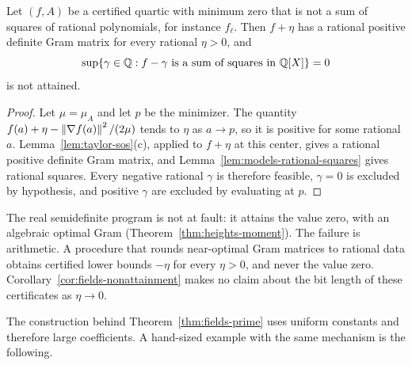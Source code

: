 \begin{corollary}
\label{cor:fields-nonattainment}
Let $(f,A)$ be a certified quartic with minimum zero that is not a sum of
squares of rational polynomials, for instance $f_\ell$. Then $f+\eta$ has a
rational positive definite Gram matrix for every rational $\eta>0$, and
\[
 \sup\{\gamma\in\mathbb Q:f-\gamma\text{ is a sum of squares in }\mathbb Q[X]\}=0
\]
is not attained.
\end{corollary}

\begin{proof}
Let $\mu=\mu_A$ and let $p$ be the minimizer. The quantity
$f(a)+\eta-\left\lVert\nabla f(a)\right\rVert^2/(2\mu)$ tends to $\eta$ as $a\to p$, so it
is positive for some rational $a$. Lemma~\ref{lem:taylor-sos}(c), applied to
$f+\eta$ at this center, gives a rational positive definite Gram matrix, and
Lemma~\ref{lem:models-rational-squares} gives rational squares. Every
negative rational $\gamma$ is therefore feasible, $\gamma=0$ is excluded by
hypothesis, and positive $\gamma$ are excluded by evaluating at $p$.
\end{proof}

The real semidefinite program is not at fault: it attains the value zero,
with an algebraic optimal Gram (Theorem~\ref{thm:heights-moment}). The
failure is arithmetic. A procedure that rounds near-optimal Gram matrices to
rational data obtains certified lower bounds $-\eta$ for every $\eta>0$, and
never the value zero. Corollary~\ref{cor:fields-nonattainment} makes no
claim about the bit length of these certificates as $\eta\to0$.

The construction behind Theorem~\ref{thm:fields-prime} uses uniform constants
and therefore large coefficients. A hand-sized example with the same
mechanism is the following.

